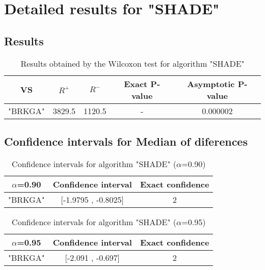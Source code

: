 \documentclass[a4paper,10pt]{article}
\begin{document}
 \clearpage 


\section{Detailed results for "SHADE"}


\subsection{Results}

\begin{table}[!htp]
\centering\small
\begin{tabular}{
|c|c|c|c|c|}
\hline
 VS & $R^{+}$ & $R^{-}$ & Exact P-value & Asymptotic P-value \\ \hline 
"BRKGA" & 3829.5 & 1120.5 & - & 0.000002\\ \hline 

\end{tabular}
\caption{Results obtained by the Wilcoxon test for algorithm "SHADE"}
\end{table}

\subsection{Confidence intervals for Median of diferences}

\begin{table}[!htp]
\centering\small
\begin{tabular}{
|c|c|c|}
\hline
 $\alpha$=0.90 & Confidence interval & Exact confidence \\ \hline 
"BRKGA" & [-1.9795 , -0.8025] & 2\\ \hline 

\end{tabular}
\caption{Confidence intervals for algorithm "SHADE" ($\alpha$=0.90)}
\end{table}
\begin{table}[!htp]
\centering\small
\begin{tabular}{
|c|c|c|}
\hline
 $\alpha$=0.95 & Confidence interval & Exact confidence \\ \hline 
"BRKGA" & [-2.091 , -0.697] & 2\\ \hline 

\end{tabular}
\caption{Confidence intervals for algorithm "SHADE" ($\alpha$=0.95)}
\end{table}

 \clearpage 
\end{document}
